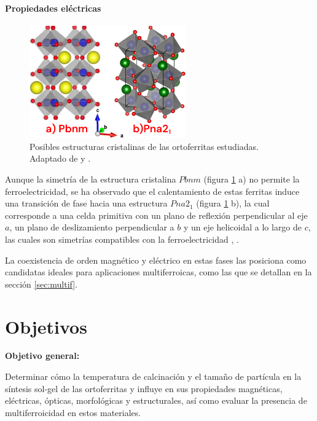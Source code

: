\documentclass[../main.tex]{subfiles}
\begin{document}
\subsubsection{Propiedades eléctricas}
\begin{figure}[H]
    \centering
    \includegraphics[width=0.6\textwidth]{fig/estructurascristalinas.png}
    \caption{Posibles estructuras cristalinas de las ortoferritas estudiadas. Adaptado de \cite{Herklotz2021} y \cite{Oumertem2019}.}
    \label{fig:estructcrist}
\end{figure}
Aunque la simetría de la estructura cristalina $Pbnm$ (figura \ref{fig:estructcrist} a) no permite la ferroelectricidad, se ha observado que el calentamiento de estas ferritas induce una transición de fase hacia una estructura $Pna2_1$ (figura \ref{fig:estructcrist} b), la cual corresponde a una celda primitiva con un plano de reflexión perpendicular al eje $a$, un plano de deslizamiento perpendicular a $b$ y un eje helicoidal a lo largo de $c$, las cuales son simetrías compatibles con la ferroelectricidad \cite{Zhang2016}, \cite{Rajaitha2022}.

La coexistencia de orden magnético y eléctrico en estas fases las posiciona como candidatas ideales para aplicaciones multiferroicas, como las que se detallan en la sección \ref{sec:multif}.
\chapter{Objetivos}
\textbf{Objetivo general:}

Determinar cómo la temperatura de calcinación y el tamaño de partícula en la síntesis sol-gel de las ortoferritas \neod{} y \sama{} influye en sus propiedades magnéticas, eléctricas, ópticas, morfológicas y estructurales, así como evaluar la presencia de multiferroicidad en estos materiales.
\end{document}
